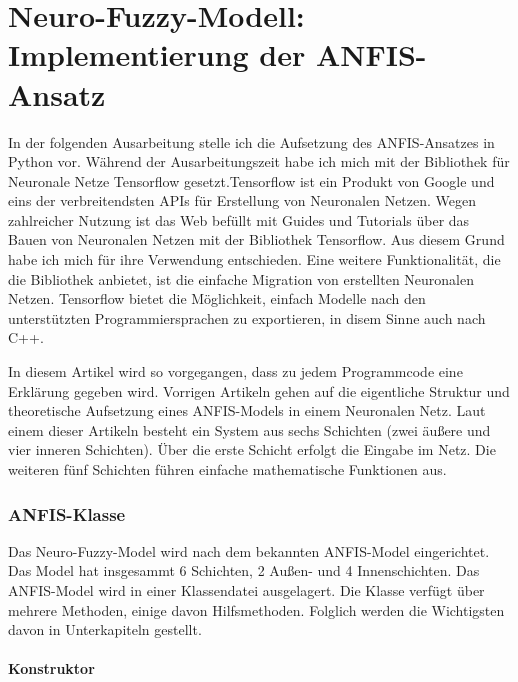 \chapter{Neuro-Fuzzy-Modell: Implementierung der
ANFIS-Ansatz}\label{neuro-fuzzy-modell-implementierung-der-anfis-ansatz}

In der folgenden Ausarbeitung stelle ich die Aufsetzung des
ANFIS-Ansatzes in Python vor. Während der Ausarbeitungszeit habe ich mich
mit der Bibliothek für Neuronale Netze Tensorflow gesetzt.Tensorflow ist ein Produkt von Google und eins der verbreitendsten APIs
für Erstellung von Neuronalen Netzen. Wegen zahlreicher Nutzung ist das
Web befüllt mit Guides und Tutorials über das Bauen von Neuronalen
Netzen mit der Bibliothek Tensorflow. Aus diesem Grund habe ich mich für
ihre Verwendung entschieden. Eine weitere Funktionalität, die die
Bibliothek anbietet, ist die einfache Migration von erstellten
Neuronalen Netzen. Tensorflow bietet die Möglichkeit, einfach Modelle
nach den unterstützten Programmiersprachen zu exportieren, in disem
Sinne auch nach C++.

In diesem Artikel wird so vorgegangen, dass zu jedem Programmcode eine
Erklärung gegeben wird. Vorrigen Artikeln gehen auf die eigentliche
Struktur und theoretische Aufsetzung eines ANFIS-Models in einem
Neuronalen Netz. Laut einem dieser Artikeln besteht ein System aus sechs
Schichten (zwei äußere und vier inneren Schichten). Über die erste
Schicht erfolgt die Eingabe im Netz. Die weiteren fünf Schichten führen
einfache mathematische Funktionen aus.

\hypertarget{anfis-klasse}{%
\subsection{ANFIS-Klasse}\label{anfis-klasse}}

Das Neuro-Fuzzy-Model wird nach dem bekannten ANFIS-Model eingerichtet.
Das Model hat insgesammt 6 Schichten, 2 Außen- und 4 Innenschichten. Das
ANFIS-Model wird in einer Klassendatei ausgelagert. Die Klasse verfügt
über mehrere Methoden, einige davon Hilfsmethoden. Folglich werden die
Wichtigsten davon in Unterkapiteln gestellt.

\hypertarget{konstruktor}{%
\subsubsection{Konstruktor}\label{konstruktor}}

